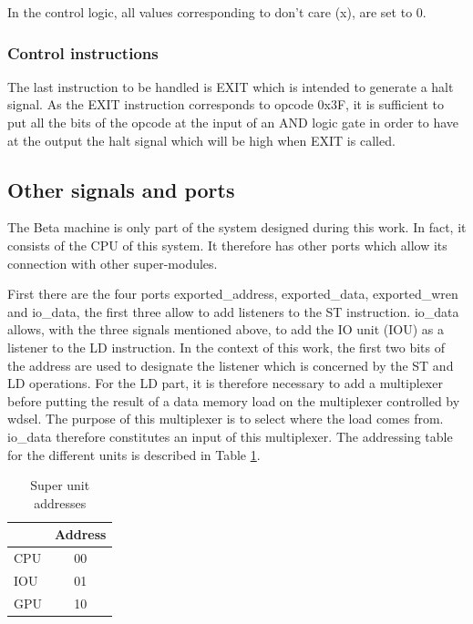 In the control logic, all values corresponding to don't care (x), are set to 0. 

\subsubsection*{Control instructions}

The last instruction to be handled is EXIT which is intended to generate a halt signal. As the EXIT 
instruction corresponds to opcode 0x3F, it is sufficient to put all the bits of the opcode at the 
input of an AND logic gate in order to have at the output the halt signal which will be high when 
EXIT is called.

\subsection{Other signals and ports}

The Beta machine is only part of the system designed during this work. In fact, it consists of the 
CPU of this system. It therefore has other ports which allow its connection with other super-modules. 

First there are the four ports exported\_address, exported\_data, exported\_wren and io\_data,
the first three allow to add listeners to the ST instruction. io\_data allows, with the 
three signals mentioned above, to add the IO unit (IOU) as a listener to the LD instruction. In the 
context of this work, the first two bits of the address are used to designate the listener which 
is concerned by the ST and LD operations. For the LD part, it is therefore necessary to add a 
multiplexer before putting the result of a data memory load on the multiplexer controlled by wdsel. 
The purpose of this multiplexer is to select where the load comes from. io\_data therefore 
constitutes an input of this multiplexer. The addressing table for the different units is described 
in Table \ref{tab:beta/address}. 

\begin{table}[H]
    \centering
    \begin{tabular}{|l|c|}
    \hline
    \rowcolor[HTML]{DAE8FC} 
    \multicolumn{1}{|c|}{\cellcolor[HTML]{DAE8FC}\textbf{Super unit}} & \textbf{Address} \\ \hline
    CPU                                                               & 00               \\ \hline
    IOU                                                               & 01               \\ \hline
    GPU                                                               & 10               \\ \hline
    \end{tabular}
    \caption{Super unit addresses}
    \label{tab:beta/address}
\end{table}

